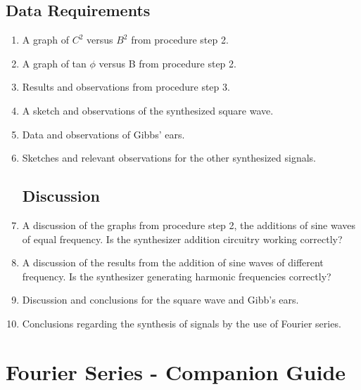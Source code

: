 \section{{\bf Data Requirements}}
\begin{enumerate}[resume]

\item A graph of $C^2$ versus $B^2$ from procedure step 2.

\item A graph of tan $\phi$ versus B from procedure step 2.

\item Results and observations from procedure step 3. 

\item A sketch and observations of the synthesized square wave.

\item Data and observations of Gibbs' ears.

\item Sketches and relevant observations for the other synthesized signals.

\section{Discussion}

\item A discussion of the graphs from procedure step 2, the additions of sine waves of equal frequency. Is the synthesizer addition circuitry working correctly?

\item A discussion of the results from the addition of sine waves of different frequency. Is the synthesizer generating harmonic frequencies correctly?

\item Discussion and conclusions for the square wave and Gibb's ears.

\item Conclusions regarding the synthesis of signals by the use of Fourier series.

\end{enumerate}


\AtEndDocument{\clearpage\ifodd\value{page}\else\null\clearpage\fi} %

%
%


\chapter{Fourier Series - Companion Guide}

